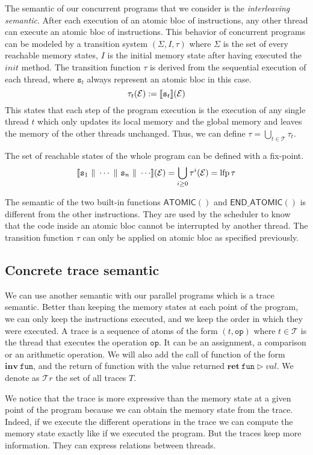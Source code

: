 \documentclass[runningheads]{llncs}
\newcommand\srule{\mathtt{s}}
\newcommand{\atomicbegin}{\mathsf{ATOMIC()}}
\newcommand{\atomicend}{\mathsf{END\_ATOMIC()}}
\newcommand{\inv}[1]{\mathbf{inv}\ \mathtt{#1}}
\newcommand{\ret}[2]{\mathbf{ret}\ \mathtt{#1} \vartriangleright #2}
\newcommand{\Thread}{\mathcal T}
\newcommand{\Traces}{\mathcal T\!r}
\newcommand{\parallelcomposition}{\Vert}
\DeclareMathOperator{\lfp}{lfp}
\begin{document}
The semantic of our concurrent programs that we consider is the \emph{interleaving semantic}. After each execution of an atomic bloc of instructions, any other thread can execute an atomic bloc of instructions. This behavior of concurrent programs can be modeled by a transition system $(\Sigma, I, \tau)$ where $\Sigma$ is the set of every reachable memory states, $I$ is the initial memory state after having executed the $init$ method. The transition function $\tau$ is derived from the sequential execution of each thread, where $\srule_t$ always represent an atomic bloc in this case. 
\[\tau_t (\mathcal E) := \exec{\srule_t}(\mathcal E)\]
This states that each step of the program execution is the execution of any single thread  $t$ which only updates its local memory and the global memory and leaves the memory of the other threads unchanged. Thus, we can define $\tau = \bigcup_{t\in\Thread} \tau_t$.

The set of reachable states of the whole program can be defined with a fix-point. 
\[\exec{\srule_1 \ \parallelcomposition \ \cdots \ \parallelcomposition \ \srule_n \ \parallelcomposition \ \cdots}(\mathcal E) = \bigcup_{i \geq 0} \tau^i(\mathcal E) = \lfp \tau\]


The semantic of the two built-in functions $\atomicbegin$ and $\atomicend$ is different from the other instructions. They are used by the scheduler to know that the code inside an atomic bloc cannot be interrupted by another thread. The transition function $\tau$ can only be applied on atomic bloc as specified previously. 


	\subsection{Concrete trace semantic}
	
We can use another semantic with our parallel programs which is a trace semantic. Better than keeping the memory states at each point of the program, we can only keep the instructions executed, and we keep the order in which they were executed. A trace is a sequence of atoms of the form $(t, \mathtt{op})$ where $t \in \Thread$ is the thread that executes the operation $\mathtt{op}$. It can be an assignment, a comparison or an arithmetic operation. We will also add the call of function of the form $\inv{fun}$, and the return of function with the value returned $\ret{fun}{val}$.
We denote as $\Traces$ the set of all traces $T$. 

We notice that the trace is more expressive than the memory state at a given point of the program because we can obtain the memory state from the trace. Indeed, if we execute the different operations in the trace we can compute the memory state exactly like if we executed the program. But the traces keep more information. They can express relations between threads.
\end{document}
